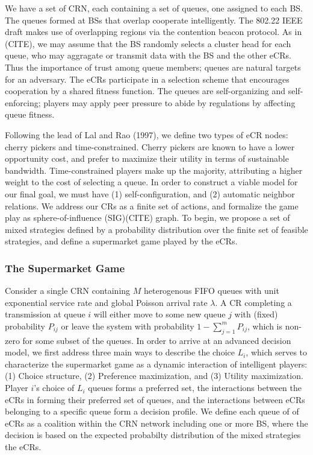 \documentclass[10pt]{article}
\theoremstyle{definition}
\begin{document}
We have a set of CRN, each containing a set of queues, one assigned to each BS. 
The queues formed at BSs that overlap cooperate intelligently. 
The 802.22 IEEE draft makes use of overlapping regions via the
contention beacon protocol. As in (CITE), we may assume that the BS randomly
selects a cluster head for each queue, who may aggragate or transmit data with
the BS and the other eCRs. Thus the importance of trust among queue members;
queues are natural targets for an adversary. 
The eCRs participate in a selection scheme that
encourages cooperation by a shared fitness function. The queues
are self-organizing and
self-enforcing; players may apply peer
pressure to abide by regulations by affecting queue fitness.

Following the lead of Lal
and Rao (1997), we define two types of eCR nodes: cherry pickers and
time-constrained. Cherry pickers are known to have a lower opportunity cost, and
prefer to maximize their utility in terms of sustainable bandwidth. 
Time-constrained players make up the majority, attributing a higher weight to
the cost of selecting a queue. 
In order to construct a viable model for our 
final goal, we must have (1) self-configuration, and (2) automatic neighbor relations. 
We address our CRs as a finite set of
actions, and formalize the game play as sphere-of-influence (SIG)(CITE) graph.
To begin, we propose a set of mixed
strategies defined by a probability distribution over
the finite set of feasible strategies, and define a 
supermarket game played by the eCRs.

\subsubsection{The Supermarket Game}

Consider a single CRN containing $M$ heterogenous FIFO queues with unit exponential service rate and global
Poisson arrival rate $\lambda$. A CR completing a transmission at queue $i$ will either 
move to some new queue $j$ with (fixed) probability $P_{ij}$ or leave the system 
with probability $\displaystyle 1-\sum _{j=1}^{m}P_{ij}$, which is non-zero for some subset of the queues. 
In order to arrive at an advanced decision model, we first address three main ways to describe the choice $L_i$, which serves to characterize the
supermarket game as a dynamic interaction of intelligent players: (1) Choice structure,
(2) Preference maximization, and (3) Utility maximization.
Player $i$'s choice of $L_i$ queues forms a preferred set, the interactions between the eCRs in forming their
preferred set of queues, and the interactions between eCRs belonging to a specific
queue form a decision profile. We define each queue of of eCRs as a coalition
within the CRN network including one or more BS, where the decision is based on
the expected probabilty distribution of the mixed strategies the eCRs.
\end{document}
